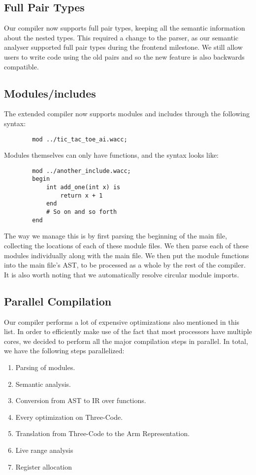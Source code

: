 \documentclass{article}
\begin{document}
        \subsection*{Full Pair Types}
        Our compiler now supports full pair types, keeping all the semantic information about the nested types. This required a change to the parser, as our semantic analyser supported full pair types during the frontend milestone. We still allow users to write code using the old pairs and so the new feature is also backwards compatible.
        
        \subsection*{Modules/includes}
        The extended compiler now supports modules and includes through the following syntax:
        \begin{verbatim}
        mod ../tic_tac_toe_ai.wacc;
        \end{verbatim}
        Modules themselves can only have functions, and the syntax looks like:
        \begin{verbatim}
        mod ../another_include.wacc;
        begin
            int add_one(int x) is
                return x + 1
            end
            # So on and so forth
        end
        \end{verbatim}
        The way we manage this is by first parsing the beginning of the main file, collecting the locations of each of these module files. We then parse each of these modules individually along with the main file. We then put the module functions into the main file's AST, to be processed as a whole by the rest of the compiler. It is also worth noting that we automatically resolve circular module imports.
        
        \subsection*{Parallel Compilation}
        Our compiler performs a lot of expensive optimizations also mentioned in this list. In order to efficiently make use of the fact that most processors have multiple cores, we decided to perform all the major compilation steps in parallel. In total, we have the following steps parallelized:
        \begin{enumerate}
            \item Parsing of modules.
            \item Semantic analysis.
            \item Conversion from AST to IR over functions.
            \item Every optimization on Three-Code.
            \item Translation from Three-Code to the Arm Representation.
            \item Live range analysis
            \item Register allocation
        \end{enumerate}
        
\end{document}
